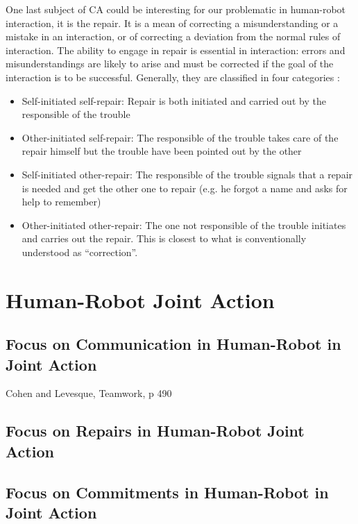 \documentclass[a4paper,11pt,twoside]{StyleThese}
\begin{document}
One last subject of CA could be interesting for our problematic in human-robot interaction, it is the repair. It is a mean of correcting a misunderstanding or a mistake in an interaction, or of correcting a deviation from the normal rules of interaction. The ability to engage in repair is essential in interaction: errors and misunderstandings are likely to arise and must be corrected if the  goal of the interaction is to be successful. Generally, they are classified in four categories \cite{schegloff_1977_preference,wooffitt_2008_conversation}:
\begin{itemize}
	\item Self-initiated self-repair: Repair is both initiated and carried out by the responsible of the trouble
	\item Other-initiated self-repair: The responsible of the trouble takes care of the repair himself but the trouble have been pointed out by the other
	\item Self-initiated other-repair: The responsible of the trouble signals that a repair is needed and get the other one to repair (e.g. he forgot a name and asks for help to remember)
	\item Other-initiated other-repair: The one not responsible of the trouble initiates and carries out the repair. This is closest to what is conventionally understood as ``correction''.
\end{itemize}

\section{Human-Robot Joint Action}\label{chap1:sec:hri_ja}


\subsection{Focus on Communication in Human-Robot in Joint Action}

Cohen and Levesque, Teamwork, p 490

\subsection{Focus on Repairs in Human-Robot Joint Action}



\subsection{Focus on Commitments in Human-Robot in Joint Action}
\end{document}
